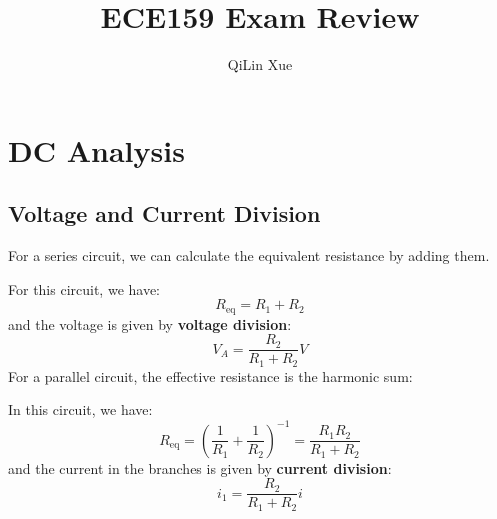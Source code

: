 \documentclass{article}
\title{ECE159 Exam Review}
\author{QiLin Xue}
\begin{document}
    \maketitle
    \tableofcontents
    \newpage
    \section{DC Analysis}
    \subsection{Voltage and Current Division}
    For a series circuit, we can calculate the equivalent resistance by adding them.
    \begin{center}
    \end{center}
    For this circuit, we have:
    \begin{equation}
        R_\text{eq} = R_1 + R_2
    \end{equation}
    and the voltage is given by \textbf{voltage division}:
    \begin{equation}
        V_A = \frac{R_2}{R_1+R_2}V
    \end{equation}
    For a parallel circuit, the effective resistance is the harmonic sum:
    \begin{center}
    \end{center}
    In this circuit, we have:
    \begin{equation}
        R_\text{eq} = \left(\frac{1}{R_1} + \frac{1}{R_2}\right)^{-1} = \frac{R_1R_2}{R_1+R_2}
    \end{equation}
    and the current in the branches is given by \textbf{current division}:
    \begin{equation}
        i_1 = \frac{R_2}{R_1+R_2}i
    \end{equation}
\end{document}
